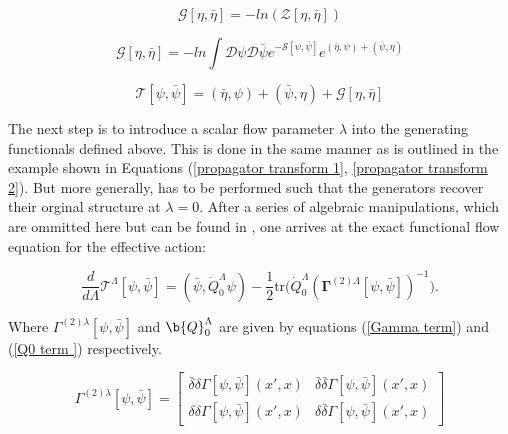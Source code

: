 \documentclass[12pt]{article}
\begin{document}
\begin{equation} \label{Greens function functional}
    \mathcal{G}[\eta, \bar{\eta}] = -ln(\mathcal{Z}[\eta, \bar{\eta}])
\end{equation}

\begin{equation}\label{G term in effective action}
    \mathcal{G}[\eta, \bar{\eta}] = 
    -ln \int{\mathcal{D}\psi \mathcal{D} \bar{\psi}e^{-\mathcal{S}[\psi, \bar{\psi}]}e^{(\bar{\eta}, \psi) +(\bar{\psi}, \eta)}}
\end{equation}

\begin{equation} \label{Effective action}
    \mathcal{T}[\psi, \bar{\psi}] = (\bar{\eta},\psi) + (\bar{\psi},\eta) + \mathcal{G}[\eta, \bar{\eta}]
\end{equation}


\noindent The next step is to introduce a scalar flow parameter $\lambda$ into the generating functionals defined above. This is done in the same manner as is outlined in the example shown in Equations (\ref{propagator transform 1}, \ref{propagator transform 2}). 
But more generally, has to be performed such that the generators recover their orginal structure at $\lambda = 0 $.
After a series of algebraic manipulations, which are ommitted here but can be found in \cite{metzner2012functional}, one arrives at the exact functional flow equation for the effective action:


\begin{equation} \label{eq:ExactFunctionalFlowEquation}
    \frac{d}{d\Lambda} \mathcal{T}^{\Lambda}[\psi, \bar{\psi}] = (\bar{\psi}, \dot{Q}_0^{\Lambda} \psi) - \frac{1}{2} \text{tr} \big( \dot{Q}_0^{\Lambda} (\boldsymbol{\Gamma}^{(2)\Lambda}[\psi, \bar{\psi}])^{-1} \big).
\end{equation}

\noindent Where $\Gamma^{(2)\lambda}[\psi, \bar{\psi}]$ and  $\b{Q}_0^{\Lambda}$ are given by equations (\ref{Gamma term}) and (\ref{Q0 term }) respectively.



\begin{equation}\label{Gamma term}
\Gamma^{(2)\lambda}[\psi, \bar{\psi}] = 
\begin{bmatrix}
\bar{\delta} \delta \Gamma[\psi, \bar{\psi}](x',x) & \bar{\delta} \bar{\delta} \Gamma[\psi, \bar{\psi}](x',x) \\
\delta \delta \Gamma[\psi, \bar{\psi}](x',x)  & \delta \bar{\delta} \Gamma[\psi, \bar{\psi}](x',x)
\end{bmatrix}
\end{equation}
\end{document}
